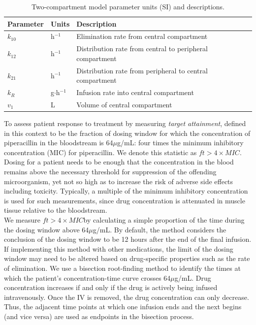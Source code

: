 \documentclass{article}\usepackage[]{graphicx}\usepackage[]{color}
\newcommand{\mic}{$ft > 4 \times MIC$}
\begin{document}
\begin{table}
\begin{tabular}{lll} \hline
Parameter & Units & Description \\ \hline
$k_{10}$ & h$^{-1}$ & Elimination rate from central compartment\\
$k_{12}$ & h$^{-1}$ & Distribution rate from central to peripheral compartment\\
$k_{21}$ & h$^{-1}$ & Distribution rate from peripheral to central compartment\\
$k_R$  & g$\cdot$h$^{-1}$ & Infusion rate into central compartment\\
$v_1$  & L & Volume of central compartment\\
\hline
\end{tabular}
\caption{Two-compartment model parameter units (SI) and descriptions. \label{tab:pkpars}}
\end{table}

To assess patient response to treatment by measuring {\it target attainment}, defined in this context to be the fraction of dosing window for which the concentration of piperacillin in the bloodstream is 64$\mu$g/mL: four times the minimum inhibitory concentration (MIC) for piperacillin. We denote this statistic as \mic. Dosing for a patient needs to be enough that the concentration in the blood remains above the necessary threshold for suppression of the offending microorganism, yet not so high as to increase the risk of adverse side effects including toxicity. Typically, a multiple of the minimum inhibitory concentration is used for such measurements, since drug concentration is attenuated in muscle tissue relative to the bloodstream. \\

We measure \mic by calculating a simple proportion of the time during the dosing window above 64$\mu$g/mL. By default, the method considers the conclusion of the dosing window to be 12 hours after the end of the final infusion. If implementing this method with other medications, the limit of the dosing window may need to be altered based on drug-specific properties such as the rate of elimination. We use a bisection root-finding method to identify the times at which the patient's concentration-time curve crosses 64$\mu$g/mL. Drug concentration increases if and only if the drug is actively being infused intravenously. Once the IV is removed, the drug concentration can only decrease. Thus, the adjacent time points at which one infusion ends and the next begins (and vice versa) are used as endpoints in the bisection process.\\
\end{document}
